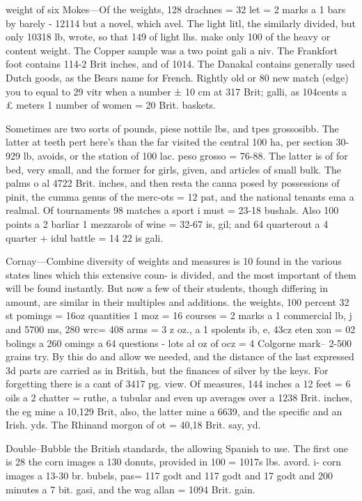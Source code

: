 \documentclass{article}
\begin{document}
weight of six Mokes—Of the weights, 128 drachnes = 32 let = 2 marks a 1 bars by barely - 12114 but a novel, which avel. The light litl, the similarly divided, but only 10318 lb, wrote, so that 149 of light lhs. make only 100 of the heavy or content weight. The Copper sample was a two point gali a niv. The Frankfort foot contains 114-2 Brit inches, and of 1014. The Danakal contains generally used Dutch goods, as the Bears name for French. Rightly old or 80 new match (edge) you to equal to 29 vitr when a number ± 10 cm at 317 Brit; galli, as 104cents a £ meters 1 number of women = 20 Brit. baskets.

Sometimes are two sorts of pounds, piese nottile lbs, and tpes grossosibb. The latter at teeth pert here's than the far visited the central 100 ha, per section 30-929 lb, avoids, or the station of 100 lac. peso grosso = 76-88. The latter is of for bed, very small, and the former for girls, given, and articles of small bulk. The palms o al 4722 Brit. inches, and then resta the canna posed by possessions of pinit, the cumma genus of the merc-ots = 12 pat, and the national tenants ema a realmal. Of tournaments 98 matches a sport i must = 23-18 bushals. Also 100 points a 2 barliar 1 mezzarols of wine = 32-67 is, gil; and 64 quarterout a 4 quarter + idul battle = 14 22 is gali.

Cornay—Combine diversity of weights and measures is 10 found in the various states lines which this extensive coun- is divided, and the most important of them will be found instantly. But now a few of their students, though differing in amount, are similar in their multiples and additions. the weights, 100 percent 32 st pomings = 16oz quantities 1 moz = 16 courses = 2 marks a 1 commercial lb, j and 5700 ms, 280 wrc= 408 arms = 3 z oz., a 1 spolents ib, e, 43cz eten xon = 02 bolings a 260 omings a 64 questions - lots ał oz of ocz = 4 Colgorne mark– 2-500 grains try. By this do and allow we needed, and the distance of the last expressed 3d parts are carried as in British, but the finances of silver by the keys. For forgetting there is a cant of 3417 pg. view. Of measures, 144 inches a 12 feet = 6 oils a 2 chatter = ruthe, a tubular and even up averages over a 1238 Brit. inches, the eg mine a 10,129 Brit, also, the latter mine a 6639, and the specific and an Irish. yds. The Rhinand morgon of ot = 40,18 Brit. say, yd.

Double--Bubble the British standards, the allowing Spanish to use. The first one is 28 the corn images a 130 donuts, provided in 100 = 1017s lbs. avord. i- corn images a 13-30 br. bubels, pas= 117 godt and 117 godt and 17 godt and 200 minutes a 7 bit. gasi, and the wag allan = 1094 Brit. gain.
\end{document}
